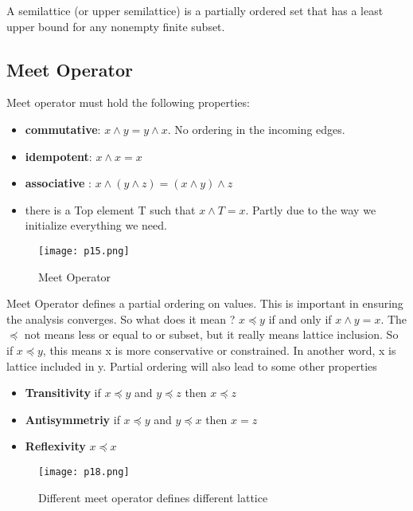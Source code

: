 A semilattice (or upper semilattice) is a partially ordered set that has a least upper bound for any
nonempty finite subset.





\subsection{ Meet Operator }

Meet operator must hold the following properties:

\begin{itemize}
	\item \textbf{commutative}: \(x \wedge y = y  \wedge x\). No ordering in the incoming edges.

	\item \textbf{idempotent}: \(x \wedge x =  x\)

	\item \textbf{associative }: \(x \wedge( y\wedge z) =  (x \wedge y) \wedge z\)

	\item there is a Top element T such that \(x \wedge T = x\). Partly due to the way
	      we initialize everything we need.
\end{itemize}

\begin{figure}[h]
	\centering
	\texttt{[image: p15.png]}
	\caption{Meet Operator}
	\label{fig:p15}
\end{figure}



Meet Operator defines a partial ordering on values. This is important in ensuring the analysis converges. So
what does it mean ? \(x \preceq y\) if and only if \(x \wedge y = x\). The \(\preceq \) not means less or equal to or subset, but it really means lattice inclusion.
So if \(x \preceq y\), this means x is more conservative or constrained. In another word, x is lattice included in y.
Partial  ordering will also lead to some other properties
\begin{itemize}
	\item \textbf{Transitivity} if \(x \preceq y\) and  \(y \preceq z\) then  \(x \preceq z\)
	\item \textbf{Antisymmetriy} if \(x \preceq y\) and  \(y \preceq x\) then  \(x = z\)
	\item \textbf{Reflexivity}  \(x \preceq x\)
\end{itemize}


\begin{figure}[h]
	\centering
	\texttt{[image: p18.png]}
	\caption{Different meet operator defines different lattice}
	\label{fig:p15}
\end{figure}


